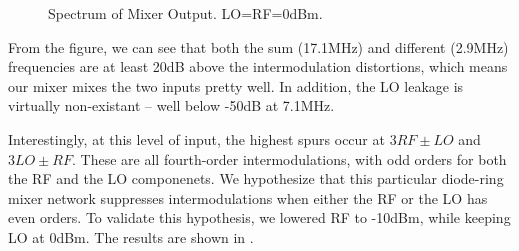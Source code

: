 \documentclass{article}
\begin{document}
\begin{figure}[h]
    \centering
    \caption{Spectrum of Mixer Output. LO=RF=0dBm.}
    \label{fig:mixer_out}
\end{figure}

From the figure, we can see that both the sum (17.1MHz) and different (2.9MHz) frequencies are at least 20dB above the intermodulation distortions, which means our mixer mixes the two inputs pretty well.
In addition, the LO leakage is virtually non-existant -- well below -50dB at 7.1MHz.

Interestingly, at this level of input, the highest spurs occur at $3RF\pm LO$ and $3LO \pm RF$.
These are all fourth-order intermodulations, with odd orders for both the RF and the LO componenets.
We hypothesize that this particular diode-ring mixer network suppresses intermodulations when either the RF or the LO has even orders.
To validate this hypothesis, we lowered RF to -10dBm, while keeping LO at 0dBm.
The results are shown in .
\end{document}
